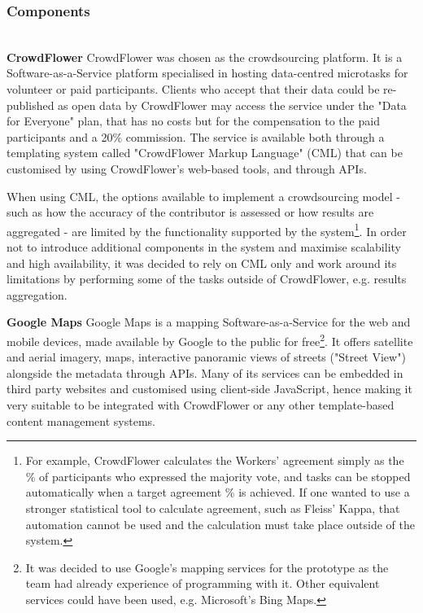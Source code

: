 \subsubsection{Components} \leavevmode \\ %

\textbf{CrowdFlower} CrowdFlower was chosen as the crowdsourcing platform. It is a Software-as-a-Service platform specialised in hosting data-centred microtasks for volunteer or paid participants. Clients who accept that their data could be re-published as open data by CrowdFlower may access the service under the "Data for Everyone" plan, that has no costs but for the compensation to the paid participants and a 20\% commission. The service is available both through a templating system called "CrowdFlower Markup Language" (CML) that can be customised by using CrowdFlower's web-based tools, and through APIs. 

When using CML, the options available to implement a crowdsourcing model - such as how the accuracy of the contributor is assessed or how results are aggregated - are limited by the functionality supported by the system\footnote{For example, CrowdFlower calculates the Workers' agreement simply as the \% of participants who expressed the majority vote, and tasks can be stopped automatically when a target agreement \% is achieved. If one wanted to use a stronger statistical tool to calculate agreement, such as Fleiss' Kappa, that automation cannot be used and the calculation must take place outside of the system.}. In order not to introduce additional components in the system and maximise scalability and high availability, it was decided to rely on CML only and work around its limitations by performing some of the tasks outside of CrowdFlower, e.g. results aggregation. 

\textbf{Google Maps} Google Maps is a mapping Software-as-a-Service for the web and mobile devices, made available by Google to the public for free\footnote{It was decided to use Google's mapping services for the prototype as the team had already experience of programming with it. Other equivalent services could have been used, e.g. Microsoft's Bing Maps.}. It offers satellite and aerial imagery, maps, interactive panoramic views of streets ("Street View") alongside the metadata through APIs. Many of its services can be embedded in third party websites and customised using client-side JavaScript, hence making it very suitable to be integrated with CrowdFlower or any other template-based content management systems. 

